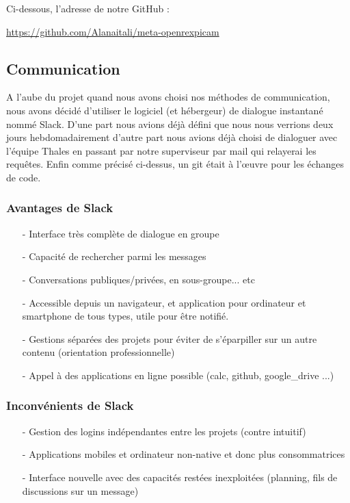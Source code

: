 Ci-dessous, l’adresse de notre GitHub :

\href{https://github.com/Alanaitali/meta-openrexpicam}{https://github.com/Alanaitali/meta-openrexpicam}

\subsection{Communication}

A l’aube du projet quand nous avons choisi nos méthodes de communication, nous avons
décidé d'utiliser le logiciel (et hébergeur) de dialogue instantané nommé Slack. D’une part
nous avions déjà défini que nous nous verrions deux jours hebdomadairement d’autre part
nous avions déjà choisi de dialoguer avec l’équipe Thales en passant par notre
superviseur par mail qui relayerai les requêtes. Enfin comme précisé ci-dessus, un git
était à l’œuvre pour les échanges de code.

\subsubsection{Avantages de Slack}

\begin{itemize}
    \item[-] Interface très complète de dialogue en groupe
    \item[-] Capacité de rechercher parmi les messages
    \item[-] Conversations publiques/privées, en sous-groupe... etc
    \item[-] Accessible depuis un navigateur, et application pour ordinateur et smartphone de tous
    types, utile pour être notifié.
    \item[-] Gestions séparées des projets pour éviter de s’éparpiller sur un autre contenu (orientation
    professionnelle)
    \item[-] Appel à des applications en ligne possible (calc, github, google\_drive ...)
\end{itemize}

\subsubsection{Inconvénients de Slack}

\begin{itemize}
    \item[-] Gestion des logins indépendantes entre les projets (contre intuitif)
    \item[-] Applications mobiles et ordinateur non-native et donc plus consommatrices
    \item[-] Interface nouvelle avec des capacités restées inexploitées (planning, fils de discussions
    sur un message)
\end{itemize}

